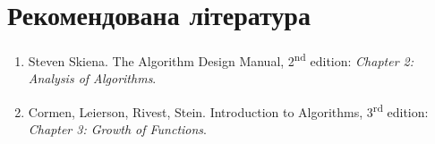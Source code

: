 \documentclass[12pt,a4paper]{report}
\begin{document}
\section*{Рекомендована література}
\begin{enumerate}
    \item Steven Skiena. The Algorithm Design Manual, 2\textsuperscript{nd} edition: {\itshape Chapter 2: Analysis of Algorithms}.
    \item Cormen, Leierson, Rivest, Stein. Introduction to Algorithms, 3\textsuperscript{rd} edition: {\itshape Chapter 3: Growth of Functions}.
\end{enumerate}
\end{document}
